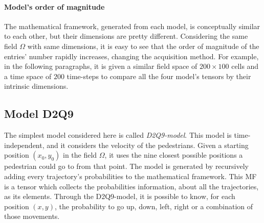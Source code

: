\documentclass[class=article, crop=false]{standalone}
\begin{document}
\paragraph{Model's order of magnitude}
The mathematical framework, generated from each model, is conceptually similar to each other, but their dimensions are pretty different. 
Considering the same field $\Omega$ with same dimensions, it is easy to see that the order of magnitude of the entries’ number rapidly increases, changing the acquisition method.
For example, in the following paragraphs, it is given a similar field space of $200\times100$ cells and a time space of $200$ time-steps to compare all the four model’s tensors by their intrinsic dimensions.


\FloatBarrier
\newpage
\subsection{Model D2Q9} \label{chap:Model_D2Q9}

The simplest model considered here is called \emph{D2Q9-model}. 
This model is time-independent, and it considers the velocity of the pedestrians. 
Given a starting position $(x_0, y_0)$ in the field $\Omega$, it uses the nine closest possible positions a pedestrian could go to from that point. 
The model is generated by recursively adding every trajectory's probabilities to the mathematical framework.
This MF is a tensor which collects the probabilities information, about all the trajectories, as its elements.
Through the D2Q9-model, it is possible to know, for each position $(x, y)$, the probability to go up, down, left, right or a combination of those movements.
\end{document}
